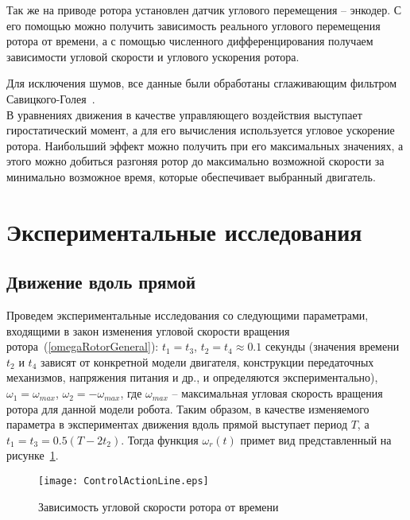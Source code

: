 Так же на приводе ротора установлен датчик углового перемещения -- энкодер. С его помощью можно получить зависимость реального углового перемещения ротора от времени, а с помощью численного дифференцирования получаем зависимости угловой скорости и углового ускорения ротора.

Для исключения шумов, все данные были обработаны сглаживающим фильтром Савицкого-Голея~\cite{Savitzky_Golay_1964}.\\

В уравнениях движения в качестве управляющего воздействия выступает гиростатический момент, а для его вычисления используется угловое ускорение ротора. Наибольший эффект можно получить при его максимальных значениях, а этого можно добиться разгоняя ротор до максимально возможной скорости за минимально возможное время, которые обеспечивает выбранный двигатель.

\section{Экспериментальные исследования}

\subsection{Движение вдоль прямой}

Проведем экспериментальные исследования со следующими параметрами, входящими в закон изменения угловой скорости вращения ротора~(\ref{omegaRotorGeneral}): $t_1=t_3$, $ t_2 = t_4 \approx 0.1 $ секунды (значения времени $ t_2$ и $ t_4 $ зависят от конкретной модели двигателя, конструкции передаточных механизмов, напряжения питания и др., и определяются экспериментально), $ \omega_1 = \omega_{max} $, $ \omega_2 = -\omega_{max} $, где $ \omega_{max} $ -- максимальная угловая скорость вращения ротора для данной модели робота. Таким образом, в качестве изменяемого параметра в экспериментах движения вдоль прямой выступает период $ T $, а $t_1=t_3 = 0.5(T - 2t_2)$. Тогда функция $ \omega_r(t) $ примет вид представленный на рисунке~\ref{ControlActionLine}.


\begin{figure}[!ht]
	\centering
	\texttt{[image: ControlActionLine.eps]}
	\caption{Зависимость угловой скорости ротора от времени}
	\label{ControlActionLine}
\end{figure}

